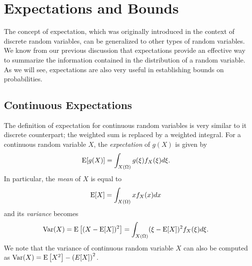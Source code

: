 \chapter{Expectations and Bounds}

The concept of expectation, which was originally introduced in the context of discrete random variables, can be generalized to other types of random variables.
We know from our previous discussion that expectations provide an effective way to summarize the information contained in the distribution of a random variable.
As we will see, expectations are also very useful in establishing bounds on probabilities.


\section{Continuous Expectations}

The definition of expectation for continuous random variables is very similar to it discrete counterpart;
the weighted sum is replaced by a weighted integral.
For a continuous random variable $X$, the \emph{expectation} of $g(X)$ is given by 
\begin{equation*}
\mathrm{E} [g(X)]
= \int_{X(\Omega)} g(\xi) f_X (\xi) d\xi .
\end{equation*}
In particular, the \emph{mean} of $X$ is equal to 
\begin{equation*}
\mathrm{E} [X]
= \int_{X(\Omega)} x f_X (x) dx
\end{equation*}
and its \emph{variance} becomes 
\begin{equation*}
\mathrm{Var} (X) = \mathrm{E} \left[ (X - \mathrm{E}[X])^2 \right]
= \int_{X(\Omega)} (\xi - \mathrm{E}[X])^2 f_X (\xi) d\xi .
\end{equation*}
We note that the variance of continuous random variable $X$ can also be computed as $\mathrm{Var}(X) = \mathrm{E} \left[ X^2 \right] - \left( E[X] \right)^2$.

